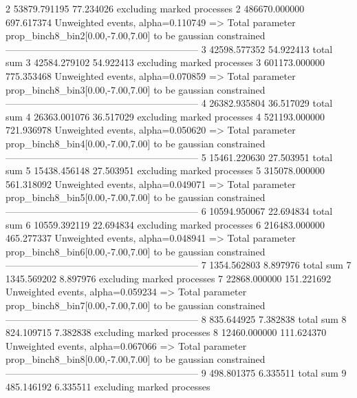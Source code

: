 2          53879.791195    77.234026       excluding marked processes    
2          486670.000000   697.617374      Unweighted events, alpha=0.110749
  => Total parameter prop_binch8_bin2[0.00,-7.00,7.00] to be gaussian constrained
------------------------------------------------------------
3          42598.577352    54.922413       total sum                     
3          42584.279102    54.922413       excluding marked processes    
3          601173.000000   775.353468      Unweighted events, alpha=0.070859
  => Total parameter prop_binch8_bin3[0.00,-7.00,7.00] to be gaussian constrained
------------------------------------------------------------
4          26382.935804    36.517029       total sum                     
4          26363.001076    36.517029       excluding marked processes    
4          521193.000000   721.936978      Unweighted events, alpha=0.050620
  => Total parameter prop_binch8_bin4[0.00,-7.00,7.00] to be gaussian constrained
------------------------------------------------------------
5          15461.220630    27.503951       total sum                     
5          15438.456148    27.503951       excluding marked processes    
5          315078.000000   561.318092      Unweighted events, alpha=0.049071
  => Total parameter prop_binch8_bin5[0.00,-7.00,7.00] to be gaussian constrained
------------------------------------------------------------
6          10594.950067    22.694834       total sum                     
6          10559.392119    22.694834       excluding marked processes    
6          216483.000000   465.277337      Unweighted events, alpha=0.048941
  => Total parameter prop_binch8_bin6[0.00,-7.00,7.00] to be gaussian constrained
------------------------------------------------------------
7          1354.562803     8.897976        total sum                     
7          1345.569202     8.897976        excluding marked processes    
7          22868.000000    151.221692      Unweighted events, alpha=0.059234
  => Total parameter prop_binch8_bin7[0.00,-7.00,7.00] to be gaussian constrained
------------------------------------------------------------
8          835.644925      7.382838        total sum                     
8          824.109715      7.382838        excluding marked processes    
8          12460.000000    111.624370      Unweighted events, alpha=0.067066
  => Total parameter prop_binch8_bin8[0.00,-7.00,7.00] to be gaussian constrained
------------------------------------------------------------
9          498.801375      6.335511        total sum                     
9          485.146192      6.335511        excluding marked processes    
